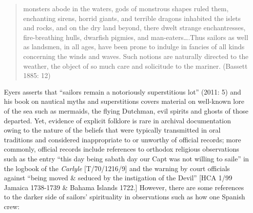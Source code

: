 \begin{quotation}
monsters abode in the waters, gods of monstrous shapes ruled them, enchanting sirens, horrid giants, and terrible dragons inhabited the islets and rocks, and on the dry land beyond, there dwelt strange enchantresses, fire-breathing hulls, dwarfish pigmies, and man-eaters….Thus sailors as well as landsmen, in all ages, have been prone to indulge in fancies of all kinds concerning the winds and waves. Such notions are naturally directed to the weather, the object of so much care and solicitude to the mariner. (Bassett 1885: 12)

\end{quotation}
\begin{styleStandard}
Eyers asserts that “sailors remain a notoriously superstitious lot” (2011: 5) and his book on nautical myths and superstitions covers material on well-known lore of the sea such as mermaids, the flying Dutchman, evil spirits and ghosts of those departed. Yet, evidence of explicit folklore is rare in archival documentation owing to the nature of the beliefs that were typically transmitted in oral traditions and considered inappropriate to or unworthy of official records; more commonly, official records include references to orthodox religious observations such as the entry “this day being sabath day our Capt was not willing to saile” in the logbook of the \textit{Carlyle} [T/70/1216/9] and the warning by court officials against “being moved \& seduced by the instigation of the Devil” [HCA 1/99 Jamaica 1738-1739 \& Bahama Islands 1722.] However, there are some references to the darker side of sailors’ spirituality in observations such as how one Spanish crew: 
\end{styleStandard}


